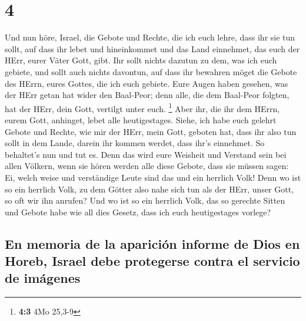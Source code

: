 \hypertarget{section-3}{%
\section{4}\label{section-3}}

 Und nun höre, Israel, die Gebote und Rechte, die ich euch
lehre, dass ihr sie tun sollt, auf dass ihr lebet und hineinkommet und
das Land einnehmet, das euch der HErr, eurer Väter Gott, gibt.
 Ihr sollt nichts dazutun zu dem, was ich euch gebiete,
und sollt auch nichts davontun, auf dass ihr bewahren möget die Gebote
des HErrn, eures Gottes, die ich euch gebiete.  Eure Augen
haben gesehen, was der HErr getan hat wider den Baal-Peor; denn alle,
die dem Baal-Peor folgten, hat der HErr, dein Gott, vertilgt unter euch.
\footnote{\textbf{4:3} 4Mo 25,3-9}  Aber ihr, die ihr dem
HErrn, eurem Gott, anhinget, lebet alle heutigestages. 
Siehe, ich habe euch gelehrt Gebote und Rechte, wie mir der HErr, mein
Gott, geboten hat, dass ihr also tun sollt in dem Lande, darein ihr
kommen werdet, dass ihr's einnehmet.  So behaltet's nun
und tut es. Denn das wird eure Weisheit und Verstand sein bei allen
Völkern, wenn sie hören werden alle diese Gebote, dass sie müssen sagen:
Ei, welch weise und verständige Leute sind das und ein herrlich Volk!
 Denn wo ist so ein herrlich Volk, zu dem Götter also nahe
sich tun als der HErr, unser Gott, so oft wir ihn anrufen?
 Und wo ist so ein herrlich Volk, das so gerechte Sitten
und Gebote habe wie all dies Gesetz, dass ich euch heutigestages
vorlege?

\hypertarget{en-memoria-de-la-apariciuxf3n-informe-de-dios-en-horeb-israel-debe-protegerse-contra-el-servicio-de-imuxe1genes}{%
\subsection{En memoria de la aparición informe de Dios en Horeb, Israel
debe protegerse contra el servicio de
imágenes}\label{en-memoria-de-la-apariciuxf3n-informe-de-dios-en-horeb-israel-debe-protegerse-contra-el-servicio-de-imuxe1genes}}

